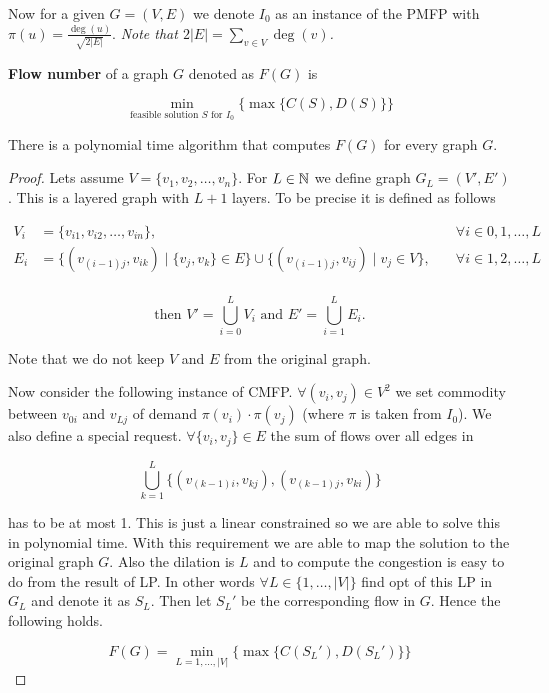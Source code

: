 Now for a given $G = (V,E)$ we denote $I_{0}$ as an instance of the PMFP with $\pi(u) = \frac{\deg(u)}{\sqrt{2|E|}}$. \textit{Note that $2|E| = \sum_{v \in V} \deg(v)$.}

\begin{defn}
	\textbf{Flow number} of a graph $G$ denoted as $F(G)$ is
	
	$$
	\min_{\text{feasible solution } S \text{ for } I_{0}} \{ \max \{ C(S), D(S) \} \}
	$$
\end{defn}

\begin{claim}
	There is a polynomial time algorithm that computes $F(G)$ for every graph $G$.
\end{claim}

\begin{proof}
	Lets assume $V = \{v_{1}, v_{2}, \dots, v_{n}\}$. For $L \in \mathbb{N}$ we define graph $G_{L} = (V', E')$. This is a layered graph with $L+1$ layers. To be precise it is defined as follows
	
	$$
	\begin{aligned}
		V_{i} &= \{v_{i1}, v_{i2}, \dots, v_{in}\}, &\quad \forall i \in 0, 1, \dots, L \\
		E_{i} &= \{(v_{(i-1)j}, v_{ik}) \mid \{v_{j}, v_{k}\} \in E \} \cup \{(v_{(i-1)j}, v_{ij}) \mid v_{j} \in V\}, &\quad \forall i \in 1,2, \dots, L \\
	\end{aligned}
	$$
	
	$$
	\text{then } V' = \bigcup_{i = 0}^{L} V_{i} \text{ and } E' = \bigcup_{i=1}^{L} E_{i}.
	$$
	
	Note that we do not keep $V$ and $E$ from the original graph.
	
	Now consider the following instance of CMFP. $\forall (v_{i}, v_{j}) \in V^2$ we set commodity between $v_{0i}$ and $v_{Lj}$ of demand $\pi(v_{i}) \cdot \pi(v_{j})$ (where $\pi$ is taken from $I_{0}$). We also define a special request. $\forall \{v_{i}, v_{j}\} \in E$ the sum of flows over all edges in
	
	$$
	\bigcup_{k = 1}^{L} \{ (v_{(k-1)i}, v_{kj}), (v_{(k-1)j}, v_{ki}) \}
	$$
	
	has to be at most 1. This is just a linear constrained so we are able to solve this in polynomial time. With this requirement we are able to map the solution to the original graph $G$. Also the dilation is $L$ and to compute the congestion is easy to do from the result of LP. In other words $\forall L \in \{1, \dots, |V|\}$ find opt of this LP in $G_{L}$ and denote it as $S_{L}$. Then let $S_{L}'$ be the corresponding flow in $G$. Hence the following holds.
	
	$$
	F(G) = \min_{L = 1, \dots, |V|} \{ \max \{ C(S_{L}'), D(S_{L}')\} \}
	$$
\end{proof}

